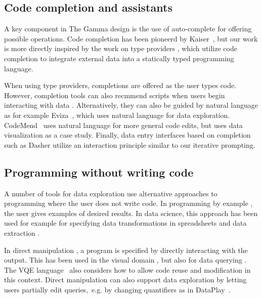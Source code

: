 \documentclass{sigchi}
\begin{document}
\subsection{Code completion and assistants}
A key component in The Gamma design is the use of auto-complete for offering possible
operations. Code completion has been pioneerd by Kaiser~\cite{assistants}, but our work is more
directly inspired by the work on type providers \cite{inforich,fsdata,dotdriven}, which utilize
code completion to integrate external data into a statically typed programming language.

When using type providers, completions are offered as the user types code. However, completion
tools can also recmmend scripts when users begin interacting with data \cite{predictive,proactive}.
Alternatively, they can also be guided by natural language as for example Eviza~\cite{eviza},
which uses natural language for data exploration. CodeMend~\cite{codemend} uses natural language
for more general code edits, but uses data visualization as a case study.
Finally, data entry interfaces based on completion such as Dasher \cite{dasher} utilize an
interaction principle similar to our iterative prompting.

\subsection{Programming without writing code}

A number of tools for data exploration use alternative approaches to programming where
the user does not write code. In programming by example \cite{byexample}, the user gives
examples of desired results. In data science, this approach has been used for example for
specifying data transformations in spreadsheets and data extraction \cite{spreadsheetpbe,flashextract}.

In direct manipulation \cite{direct}, a program is specified by directly interacting with the
output. This has been used in the visual domain \cite{sketchnsketch}, but also for data querying
\cite{dynamicq,vlang}. The VQE language~\cite{visage} also considers how to allow code reuse and
modification in this context. Direct manipulation can also support data exploration by letting
users partially edit queries,~e.g. by changing quantifiers as in DataPlay~\cite{dataplay}.

\newpage
\end{document}
